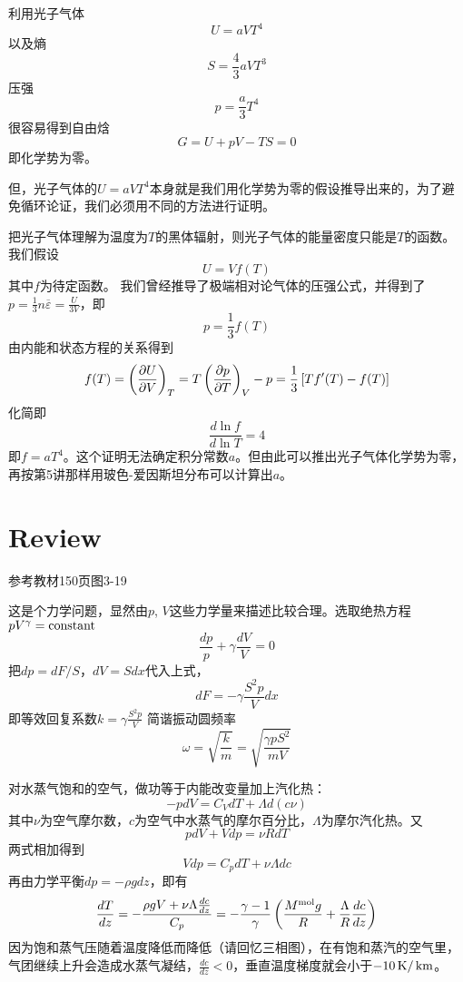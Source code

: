 \documentclass[CJK]{beamer}
\begin{document}
\begin{frame}
\bch
利用光子气体
$$U = aV T^4$$
以及熵
$$ S = \frac{4}{3}aV T^3$$
压强
$$ p = \frac{a}{3} T^4$$
很容易得到自由焓
$$ G = U + pV - TS = 0$$
即化学势为零。

但，光子气体的$U = aVT^4$本身就是我们用化学势为零的假设推导出来的，为了避免循环论证，我们必须用不同的方法进行证明。
\ech
\end{frame}


\begin{frame}
\bch
{\small
把光子气体理解为温度为$T$的黑体辐射，则光子气体的能量密度只能是$T$的函数。我们假设
$$ U = V f(T)$$
其中$f$为待定函数。
我们曾经推导了极端相对论气体的压强公式，并得到了$p = \frac{1}{3} n\overline{\varepsilon} = \frac{U}{3V} $，即
$$p = \frac{1}{3} f(T)$$
由内能和状态方程的关系得到
$$ f(T) = \left(\frac{\partial U}{\partial V}\right)_{T} = T\left(\frac{\partial p}{\partial T}\right)_{V} - p = \frac{1}{3} \left[T f'(T) - f(T)\right]$$
化简即
$$ \frac{d \ln f}{d\ln T}  = 4 $$
即$ f = a T^4 $。这个证明无法确定积分常数$a$。但由此可以推出光子气体化学势为零，再按第5讲那样用玻色-爱因斯坦分布可以计算出$a$。
}
\ech
\end{frame}

\section{Review}

\begin{frame}
\end{frame}


\begin{frame}
\bch
参考教材150页图3-19

这是个力学问题，显然由$p$, $V$这些力学量来描述比较合理。选取绝热方程$pV^\gamma = \mathrm{constant}$
$$ \frac{dp}{p} + \gamma \frac{dV}{V} = 0$$
把$dp = dF/S$，$dV = S dx$代入上式，
$$ dF = -\gamma \frac{S^2p}{V} dx $$
即等效回复系数$k =\gamma \frac{S^2p}{V} $ 简谐振动圆频率
$$\omega = \sqrt{\frac{k}{m}} = \sqrt{\frac{\gamma p S^2}{mV}}$$
\ech
\end{frame}

\begin{frame}
\bch
{\small
对水蒸气饱和的空气，做功等于内能改变量加上汽化热：
$$ -pdV = C_V dT + \Lambda d(c\nu) $$
其中$\nu$为空气摩尔数，$c$为空气中水蒸气的摩尔百分比，$\Lambda$为摩尔汽化热。又
$$pdV + Vdp = \nu R dT$$
两式相加得到
$$ Vdp = C_p  dT + \nu \Lambda dc $$
再由力学平衡$ dp = -\rho g dz$，即有
$$ \frac{dT}{dz} =-\frac{\rho g V + \nu\Lambda\frac{dc}{dz}}{C_p} = -\frac{\gamma-1}{\gamma}\left(\frac{M^{\rm mol}g}{R}+\frac{\Lambda}{R}\frac{dc}{dz}\right)$$
因为饱和蒸气压随着温度降低而降低（请回忆三相图），在有饱和蒸汽的空气里，气团继续上升会造成水蒸气凝结，$ \frac{dc}{dz} < 0 $，垂直温度梯度就会小于$-10\,\mathrm{K}/\,\mathrm{km}$。
}
\ech
\end{frame}
\end{document}
